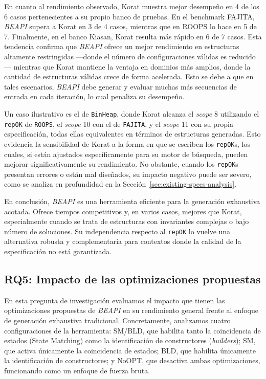 En cuanto al rendimiento observado, \textsf{Korat} muestra mejor desempeño en 4 de los 6 casos 
pertenecientes a su propio banco de pruebas. En el benchmark \textsf{FAJITA}, \emph{BEAPI} supera 
a \textsf{Korat} en 3 de 4 casos, mientras que en \textsf{ROOPS} lo hace en 5 de 7. Finalmente, 
en el banco \textsf{Kiasan}, \textsf{Korat} resulta más rápido en 6 de 7 casos. Esta tendencia confirma 
que \emph{BEAPI} ofrece un mejor rendimiento en estructuras altamente restringidas —donde el número 
de configuraciones válidas es reducido— mientras que \textsf{Korat} mantiene la ventaja en dominios 
más amplios, donde la cantidad de estructuras válidas crece de forma acelerada. Esto se debe a que 
en tales escenarios, \emph{BEAPI} debe generar y evaluar muchas más secuencias de entrada en cada 
iteración, lo cual penaliza su desempeño.

Un caso ilustrativo es el de \texttt{BinHeap}, donde \textsf{Korat} alcanza el \emph{scope} 8 utilizando 
el \texttt{repOK} de \texttt{ROOPS}, el \emph{scope} 10 con el de \texttt{FAJITA}, y el \emph{scope} 11 
con su propia especificación, todas ellas equivalentes en términos de estructuras generadas. Esto evidencia 
la sensibilidad de \textsf{Korat} a la forma en que se escriben los \texttt{repOK}s, los cuales, si están 
ajustados específicamente para su motor de búsqueda, pueden mejorar significativamente su rendimiento. 
No obstante, cuando los \texttt{repOK}s presentan errores o están mal diseñados, su impacto negativo 
puede ser severo, como se analiza en profundidad en la Sección~\ref{sec:existing-specs-analysis}.

En conclusión, \emph{BEAPI} es una herramienta eficiente para la generación exhaustiva acotada. 
Ofrece tiempos competitivos y, en varios casos, mejores que \textsf{Korat}, especialmente cuando 
se trata de estructuras con invariantes complejas o bajo número de soluciones. Su independencia 
respecto al \texttt{repOK} lo vuelve una alternativa robusta y complementaria para contextos donde 
la calidad de la especificación no está garantizada.


\subsection{RQ5: Impacto de las optimizaciones propuestas}
\label{sec:optimizations}

En esta pregunta de investigación evaluamos el impacto que tienen las optimizaciones propuestas 
de \emph{BEAPI} en su rendimiento general frente al enfoque de generación exhaustiva tradicional. 
Concretamente, analizamos cuatro configuraciones de la herramienta: \textsf{SM/BLD}, que habilita tanto 
la coincidencia de estados (State Matching) como la identificación de constructores (\emph{builders}); 
\textsf{SM}, que activa únicamente la coincidencia de estados; \textsf{BLD}, que habilita únicamente 
la identificación de constructores; y \textsf{NoOPT}, que desactiva ambas optimizaciones, funcionando 
como un enfoque de fuerza bruta.

